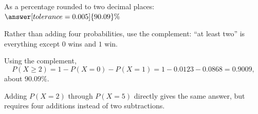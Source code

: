 \documentclass[12pt]{ximera}
\begin{document}
\begin{problem}
\begin{prompt}
As a percentage rounded to two decimal places: $\answer[tolerance=0.005]{90.09}\%$

\begin{hint}
Rather than adding four probabilities, use the complement: ``at least two'' is
everything except $0$ wins and $1$ win.
\end{hint}

\begin{feedback}
Using the complement,
\[
P(X\ge 2) = 1 - P(X=0) - P(X=1) = 1 - 0.0123 - 0.0868 = 0.9009,
\]
about $90.09\%$.

Adding $P(X=2)$ through $P(X=5)$ directly gives the same answer, but requires four
additions instead of two subtractions.
\end{feedback}
\end{prompt}
\end{problem}
\end{document}
